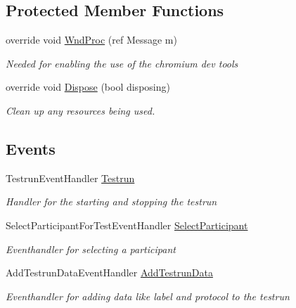 \subsection*{Protected Member Functions}
\begin{DoxyCompactItemize}
\item 
override void \hyperlink{class_web_analyzer_1_1_u_i_1_1_testrun_form_a6bab770d19d208650e80e3a99d4af112}{Wnd\+Proc} (ref Message m)
\begin{DoxyCompactList}\small\item\em Needed for enabling the use of the chromium dev tools \end{DoxyCompactList}\item 
override void \hyperlink{class_web_analyzer_1_1_u_i_1_1_testrun_form_a532f52d26e600d080622a943b4306110}{Dispose} (bool disposing)
\begin{DoxyCompactList}\small\item\em Clean up any resources being used. \end{DoxyCompactList}\end{DoxyCompactItemize}
\subsection*{Events}
\begin{DoxyCompactItemize}
\item 
Testrun\+Event\+Handler \hyperlink{class_web_analyzer_1_1_u_i_1_1_testrun_form_ac07b8e3d6b66e219b067dcacd1535f2c}{Testrun}
\begin{DoxyCompactList}\small\item\em Handler for the starting and stopping the testrun \end{DoxyCompactList}\item 
Select\+Participant\+For\+Test\+Event\+Handler \hyperlink{class_web_analyzer_1_1_u_i_1_1_testrun_form_a18eca3a8ed7f598778799921d9564428}{Select\+Participant}
\begin{DoxyCompactList}\small\item\em Eventhandler for selecting a participant \end{DoxyCompactList}\item 
Add\+Testrun\+Data\+Event\+Handler \hyperlink{class_web_analyzer_1_1_u_i_1_1_testrun_form_a29bd18b6bcaf8b884378062e278b99b1}{Add\+Testrun\+Data}
\begin{DoxyCompactList}\small\item\em Eventhandler for adding data like label and protocol to the testrun \end{DoxyCompactList}\end{DoxyCompactItemize}
